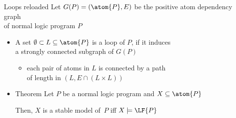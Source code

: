 \begin{frame}{Loops reloaded}
  \bigskip
  Let $G(P) = (\atom{P},E)$ be the positive atom dependency graph\\ of normal logic program $P$
  \par
  \smallskip
  \begin{itemize}
  \item<2-> A set $\emptyset\subset L \subseteq \atom{P}$ is a \alert{loop} of $P$,
    if it induces\\a{} strongly connected subgraph of $G(P)$
    \begin{itemize}\normalsize
    \item[\itarrow] each pair of atoms in $L$ is connected by a path\\
      of length in $(L,E\cap(L \times L))$
    \end{itemize}
    \medskip
  \item<4->[] \par
    \begin{minipage}[t]{0.8\linewidth}
      \begin{block}{Theorem}
        Let $P$ be a normal logic program and $X\subseteq\atom{P}$
        \par\medskip
        Then, $X$ is a stable model of~$P$ iff $X\models\LF{P}$
      \end{block}
    \end{minipage}
  \end{itemize}
\end{frame}
%
